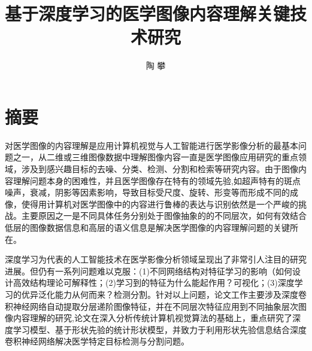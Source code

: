   \confidential{}%
  \title[中国科学院大学博士论文]{基于深度学习的医学图像内容理解关键技术研究}%
  \author{陶 攀}%
\maketitle
\makeenglishtitle
\makedeclaration
\chapter*{摘\quad 要}%
\setcounter{page}{1}%

对医学图像的内容理解是应用计算机视觉与人工智能进行医学影像分析的最基本问题之一，从二维或三维图像数据中理解图像内容一直是医学图像应用研究的重点领域，涉及到感兴趣目标的去噪、分类、检测、分割和检索等研究内容。由于图像内容理解问题本身的困难性，并且医学图像存在特有的领域先验,如超声特有的斑点噪声，衰减，阴影等因素影响，导致目标受尺度、旋转、形变等而形成不同的成像，使得用计算机对医学图像中的内容进行鲁棒的表达与识别依然是一个严峻的挑战。主要原因之一是不同具体任务分别处于图像抽象的的不同层次，如何有效结合低层的图像数据信息和高层的语义信息是解决医学图像的内容理解问题的关键所在。

深度学习为代表的人工智能技术在医学影像分析领域呈现出了非常引人注目的研究进展。但仍有一系列问题难以克服：(1)不同网络结构对特征学习的影响（如何设计高效结构理论可解释性；(2)学习到的特征为什么能起作用？可视化；(3)深度学习的优异泛化能力从何而来？检测分割。针对以上问题，论文工作主要涉及深度卷积神经网络自动提取分层递阶图像特征，并在不同层次特征应用到不同抽象层次图像内容理解的研究,论文在深入分析传统计算机视觉算法的基础上，重点研究了深度学习模型、基于形状先验的统计形状模型，并致力于利用形状先验信息结合深度卷积神经网络解决医学特定目标检测与分割问题。


